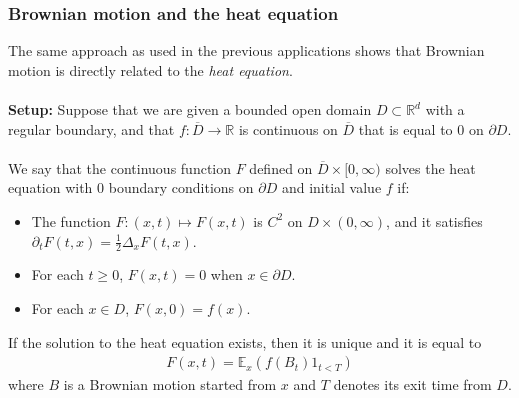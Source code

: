 \documentclass[../mainfile.tex]{subfiles}
\begin{document}
\subsubsection{Brownian motion and the heat equation}
The same approach as used in the previous applications shows that Brownian motion is directly related to the \textit{heat equation}.
\\\\
\textbf{Setup:} Suppose that we are given a bounded open domain $D \subset \mathbb{R}^d$ with a regular boundary, and that $f: \overline{D} \to \mathbb{R}$ is continuous on $\overline{D}$ that is equal to $0$ on $\partial D$.
\\
\\
 We say that the continuous function $F$ defined on $\overline{D} \times [0, \infty)$ solves the heat equation with $0$ boundary conditions on $\partial D$ and initial value $f$ if:
 \begin{itemize}
 \item The function $F: (x,t) \mapsto F(x,t)$ is $C^2$ on $D \times (0, \infty)$, and it satisfies $\partial_t F(t,x)= \frac{1}{2} \Delta_x F(t,x)$.
 \item For each $t \geq 0$, $F(x,t)=0$ when $x \in \partial D$. 
 \item For each $x \in D$, $F(x,0)=f(x)$.
 \end{itemize}
 \begin{prop} If the solution to the heat equation exists, then it is unique and it is equal to  
 \begin{align*}
 F(x,t)= \mathbb{E}_x(f(B_t)1_{t < T})
 \end{align*}
 where $B$ is a Brownian motion started from $x$ and $T$ denotes its exit time from $D$. 
 \end{prop}
\end{document}
